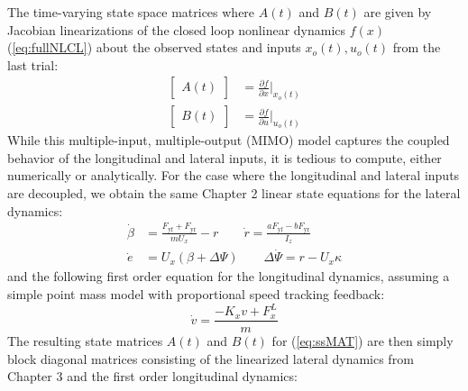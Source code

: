  The time-varying state space matrices  where $A(t)$ and $B(t)$ are given by Jacobian linearizations of the closed loop nonlinear dynamics $f(x)$ (\ref{eq:fullNLCL}) about the observed states and inputs $x_o(t), u_o(t)$ from the last trial:
 \begin{align}
 \label{eq:C4nl}
 \begin{bmatrix} A(t) \end{bmatrix} &= \frac{\partial{f}}{\partial{x}}\Big|_{x_o(t)} \\
 \begin{bmatrix} B(t) \end{bmatrix} &= \frac{\partial{f}}{\partial{u}}\Big|_{u_o(t)}
 \end{align}
 While this multiple-input, multiple-output (MIMO) model captures the coupled behavior of the longitudinal and lateral inputs, it is tedious to compute,
 either numerically or analytically. For the case where the longitudinal and lateral inputs are decoupled, we obtain the same Chapter 2 linear state equations for the lateral
 dynamics: 
\begin{subequations}
\label{eq:bmC4}
\begin{align}
	\dot{\beta} &= \frac{F_\mathrm{yf}+F_\mathrm{yr}}{mU_x} - r \qquad \dot{r} = \frac{aF_\mathrm{yf} - bF_\mathrm{yr}}{I_z} \label{bm1} \\
	\dot{e} &= U_x (\beta + \Delta\Psi) \qquad \Delta\dot{\Psi} = r - U_x\kappa \label{eq:bm2} 
\end{align}
\end{subequations} 
and the following first order equation for the longitudinal dynamics, assuming a simple point mass model with proportional
speed tracking feedback:
\begin{equation}
\dot{v} = \frac{-K_xv + F^L_x}{m}
\end{equation}
The resulting state matrices $A(t)$ and $B(t)$ for (\ref{eq:ssMAT}) are then simply block diagonal matrices consisting of the
linearized lateral dynamics from Chapter 3 and the first order longitudinal dynamics:

